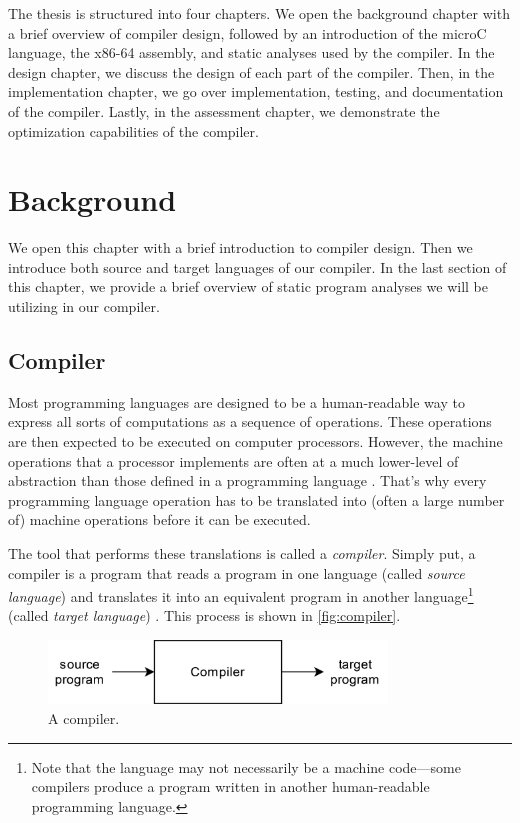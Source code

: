 \documentclass[thesis=M,english]{FITthesis}[2019/12/23]
\begin{document}
The thesis is structured into four chapters. We open the background chapter with a brief overview of compiler design, followed by an introduction of the microC language, the x86-64 assembly, and static analyses used by the compiler. In the design chapter, we discuss the design of each part of the compiler. Then, in the implementation chapter, we go over implementation, testing, and documentation of the compiler. Lastly, in the assessment chapter, we demonstrate the optimization capabilities of the compiler.




\chapter{Background}
We open this chapter with a brief introduction to compiler design. Then we introduce both source and target languages of our compiler. In the last section of this chapter, we provide a brief overview of static program analyses we will be utilizing in our compiler.

\section{Compiler}
Most programming languages are designed to be a human-readable way to express all sorts of computations as a sequence of operations. These operations are then expected to be executed on computer processors. However, the machine operations that a processor implements are often at a much lower-level of abstraction than those defined in a programming language \cite[Chap. 1.1]{eng_comp}. That's why every programming language operation has to be translated into (often a large number of) machine operations before it can be executed.

The tool that performs these translations is called a \emph{compiler}. Simply put, a compiler is a program that reads a program in one language (called \emph{source language}) and translates it into an equivalent program in another language\footnote{Note that the language may not necessarily be a machine code---some compilers produce a program written in another human-readable programming language.} (called \emph{target language}) \cite[Chap. 1.1]{dragonbook}. This process is shown in \autoref{fig:compiler}.

\begin{figure}
    \centering
    \includegraphics[width=9cm]{img/compiler.png}
    \caption{A compiler.}\label{fig:compiler}
\end{figure}
\end{document}
